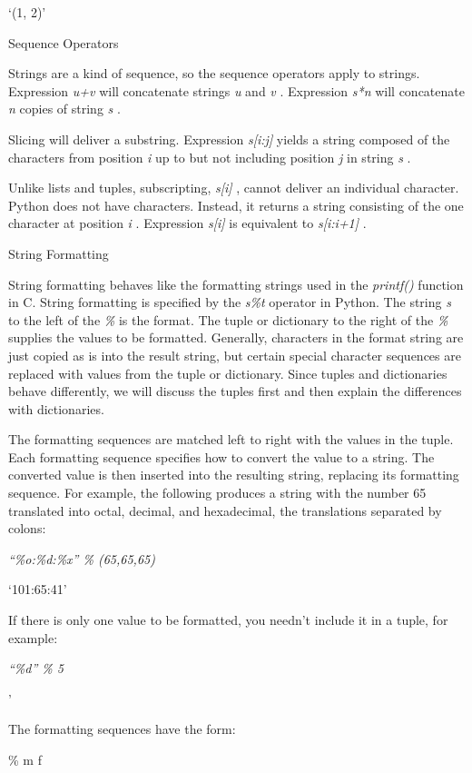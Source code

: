 `(1, 2)'

Sequence Operators

Strings are a kind of sequence, so
the sequence operators apply to strings. Expression \emph{u+v} will
concatenate strings \emph{u} and \emph{v} . Expression \emph{s*n} will
concatenate \emph{n} copies of string \emph{s} .

Slicing will deliver a substring.
Expression \emph{s{[}i:j{]}} yields a string composed of the characters
from position \emph{i} up to but not including position \emph{j} in
string \emph{s} .

Unlike lists and tuples,
subscripting, \emph{s{[}i{]}} , cannot deliver an individual character.
Python does not have characters. Instead, it returns a string consisting
of the one character at position \emph{i} . Expression \emph{s{[}i{]}}
is equivalent to \emph{s{[}i:i+1{]}} .

String Formatting

String formatting behaves like the
formatting strings used in the \emph{printf()} function in C. String
formatting is specified by the \emph{s\%t} operator in Python. The
string \emph{s} to the left of the \emph{\%} is the format. The tuple or
dictionary to the right of the \emph{\%} supplies the values to be
formatted. Generally, characters in the format string are just copied as
is into the result string, but certain special character sequences are
replaced with values from the tuple or dictionary. Since tuples and
dictionaries behave differently, we will discuss the tuples first and
then explain the differences with dictionaries.

 The formatting
sequences are matched left to right with the values in the tuple. Each
formatting sequence specifies how to convert the value to a string. The
converted value is then inserted into the resulting string, replacing
its formatting sequence. For example, the following produces a string
with the number 65 translated into octal, decimal, and hexadecimal, the
translations separated by colons:


\emph{``\%o:\%d:\%x'' \% (65,65,65)}

`101:65:41'

If there is only one value to be
formatted, you needn't include it in a tuple, for example:


\emph{``\textbar{}\%d\textbar{}'' \% 5}

'

The formatting sequences have the
form:

\% m f

